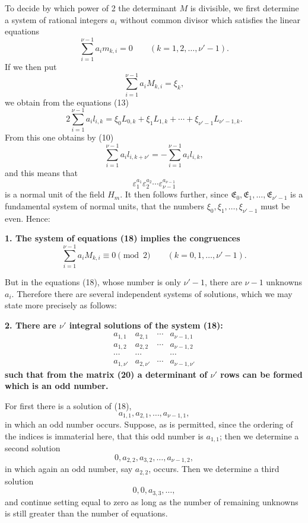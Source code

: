 \documentclass[11pt]{article}
\begin{document}
To decide by which power of 2 the determinant $M$ is divisible, we first determine a system of rational integers $a_i$ without common divisor which satisfies the linear equations
\begin{equation}
\sum_{i=1}^{\nu-1}a_im_{k,i}=0\qquad(k=1,2,\ldots,\nu'-1).
\tag{18}
\end{equation}
If we then put
\[
\sum_{i=1}^{\nu-1}a_iM_{k,i}=\xi_k,
\]
we obtain from the equations (13)
\[
2\sum_{i=1}^{\nu-1}a_il_{i,k}=\xi_0L_{0,k}+\xi_1L_{1,k}+\cdots+\xi_{\nu'-1}L_{\nu'-1,k}.
\]
From this one obtains by (10)
\[
\sum_{i=1}^{\nu-1}a_il_{i,k+\nu'}=-\sum_{i=1}^{\nu-1}a_il_{i,k},
\]
and this means that
\[
\varepsilon_1^{a_1}\varepsilon_2^{a_2}\cdots\varepsilon_{\nu-1}^{a_{\nu-1}}
\]
is a normal unit of the field $H_m$. It then follows further, since $\mathfrak E_0,\mathfrak E_1,\ldots,\mathfrak E_{\nu'-1}$ is a fundamental system of normal units, that the numbers $\xi_0,\xi_1,\ldots,\xi_{\nu'-1}$ must be even. Hence:

\begin{center}\textbf{1. The system of equations (18) implies the congruences
\[
\sum_{i=1}^{\nu-1}a_iM_{k,i}\equiv0\pmod2\qquad(k=0,1,\ldots,\nu'-1).
\tag{19}
\]}\end{center}

But in the equations (18), whose number is only $\nu'-1$, there are $\nu-1$ unknowns $a_i$. Therefore there are several independent systems of solutions, which we may state more precisely as follows:

\begin{center}\textbf{2. There are $\nu'$ integral solutions of the system (18):}
\[
\begin{array}{cccc}
a_{1,1}&a_{2,1}&\cdots&a_{\nu-1,1}\\
a_{1,2}&a_{2,2}&\cdots&a_{\nu-1,2}\\
\cdots&\cdots&&\cdots\\
a_{1,\nu'}&a_{2,\nu'}&\cdots&a_{\nu-1,\nu'}
\end{array}
\tag{20}
\]
\textbf{such that from the matrix (20) a determinant of $\nu'$ rows can be formed which is an odd number.}\end{center}

For first there is a solution of (18),
\[
a_{1,1},a_{2,1},\ldots,a_{\nu-1,1},
\]
in which an odd number occurs. Suppose, as is permitted, since the ordering of the indices is immaterial here,
that this odd number is $a_{1,1}$; then we determine a second solution
\[
0,a_{2,2},a_{3,2},\ldots,a_{\nu-1,2},
\]
in which again an odd number, say $a_{2,2}$, occurs. Then we determine a third solution
\[
0,0,a_{3,3},\ldots,
\]
and continue setting equal to zero as long as the number of remaining unknowns is still greater than the number of equations.
\end{document}
